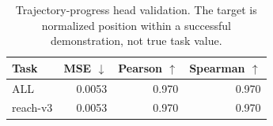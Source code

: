 \begin{table}[t]
\centering
\caption{Trajectory-progress head validation. The target is normalized position within a successful demonstration, not true task value.}
\label{tab:progress-head-validation}
\begin{tabular}{lrrr}
\toprule
Task & MSE $\downarrow$ & Pearson $\uparrow$ & Spearman $\uparrow$ \\
\midrule
ALL & 0.0053 & 0.970 & 0.970 \\
reach-v3 & 0.0053 & 0.970 & 0.970 \\
\bottomrule
\end{tabular}
\end{table}
